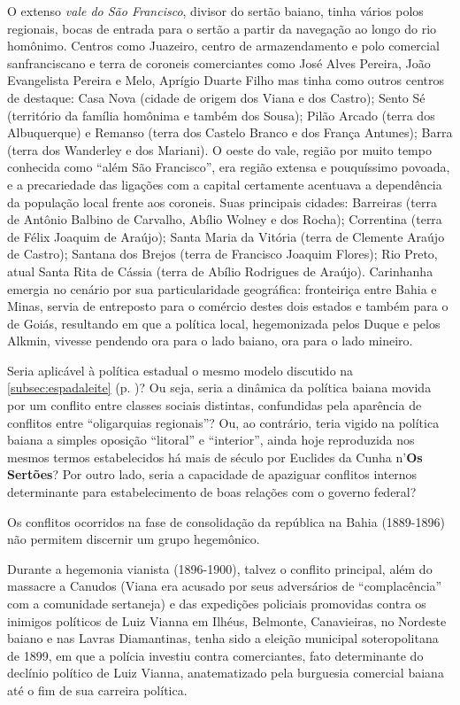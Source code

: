 O extenso \textit{vale do São Francisco}, divisor do sertão baiano, tinha vários polos regionais, bocas de entrada para o sertão a partir da navegação ao longo do rio homônimo. Centros como Juazeiro, centro de armazendamento e polo comercial sanfranciscano e terra de coroneis comerciantes como José Alves Pereira, João Evangelista Pereira e Melo, Aprígio Duarte Filho  mas tinha como outros centros de destaque: Casa Nova (cidade de origem dos Viana e dos Castro); Sento Sé (território da família homônima e também dos Sousa); Pilão Arcado (terra dos Albuquerque) e Remanso (terra dos Castelo Branco e dos França Antunes); Barra (terra dos Wanderley e dos Mariani). O oeste do vale, região por muito tempo conhecida como ``além São Francisco'', era região extensa e pouquíssimo povoada, e a precariedade das ligações com a capital certamente acentuava a dependência da população local frente aos coroneis. Suas principais cidades: Barreiras (terra de Antônio Balbino de Carvalho, Abílio Wolney e dos Rocha); Correntina (terra de Félix Joaquim de Araújo); Santa Maria da Vitória (terra de Clemente Araújo de Castro); Santana dos Brejos (terra de Francisco Joaquim Flores); Rio Preto, atual Santa Rita de Cássia (terra de Abílio Rodrigues de Araújo). Carinhanha emergia no cenário por sua particularidade geográfica: fronteiriça entre Bahia e Minas, servia de entreposto para o comércio destes dois estados e também para o de Goiás, resultando em que a política local, hegemonizada pelos Duque e pelos Alkmin, vivesse pendendo ora para o lado baiano, ora para o lado mineiro.

Seria aplicável à política estadual o mesmo modelo discutido na \autoref{subsec:espadaleite} (p. \pageref{subsec:espadaleite})? Ou seja, seria a dinâmica da política baiana movida por um conflito entre classes sociais distintas, confundidas pela aparência de conflitos entre ``oligarquias regionais''? Ou, ao contrário, teria vigido na política baiana a simples oposição ``litoral'' e ``interior'', ainda hoje reproduzida nos mesmos termos estabelecidos há mais de século por Euclides da Cunha n'\textbf{Os Sertões}? Por outro lado, seria a capacidade de apaziguar conflitos internos determinante para estabelecimento de boas relações com o governo federal?

Os conflitos ocorridos na fase de consolidação da república na Bahia (1889-1896) não permitem discernir um grupo hegemônico.

Durante a hegemonia vianista (1896-1900), talvez o conflito principal, além do massacre a Canudos (Viana era acusado por seus adversários de ``complacência'' com a comunidade sertaneja) e das expedições policiais promovidas contra os inimigos políticos de Luiz Vianna em Ilhéus, Belmonte, Canavieiras, no Nordeste baiano e nas Lavras Diamantinas, tenha sido a eleição municipal soteropolitana de 1899, em que a polícia investiu contra comerciantes, fato determinante do declínio político de Luiz Vianna, anatematizado pela burguesia comercial baiana até o fim de sua carreira política. 

